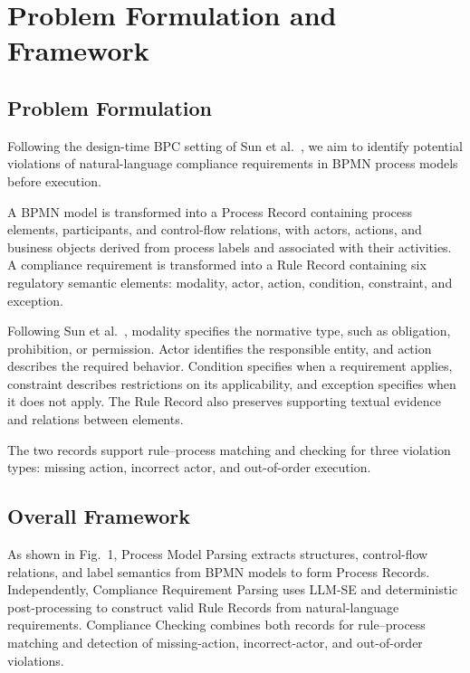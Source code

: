 \documentclass[conference]{IEEEtran}
\begin{document}
\section{Problem Formulation and Framework}
\label{sec:2}

\subsection{Problem Formulation}
\label{sec:2.1}

Following the design-time BPC setting of Sun et al.~\cite{sun2024design}, we aim to identify potential violations of natural-language compliance requirements in BPMN process models before execution.

A BPMN model is transformed into a Process Record containing process elements, participants, and control-flow relations, with actors, actions, and business objects derived from process labels and associated with their activities. A compliance requirement is transformed into a Rule Record containing six regulatory semantic elements: modality, actor, action, condition, constraint, and exception.

Following Sun et al.~\cite{sun2024design}, modality specifies the normative type, such as obligation, prohibition, or permission. Actor identifies the responsible entity, and action describes the required behavior. Condition specifies when a requirement applies, constraint describes restrictions on its applicability, and exception specifies when it does not apply. The Rule Record also preserves supporting textual evidence and relations between elements.

The two records support rule--process matching and checking for three violation types: missing action, incorrect actor, and out-of-order execution.

\subsection{Overall Framework}
\label{sec:2.2}

As shown in Fig.~1, Process Model Parsing extracts structures, control-flow relations, and label semantics from BPMN models to form Process Records. Independently, Compliance Requirement Parsing uses LLM-SE and deterministic post-processing to construct valid Rule Records from natural-language requirements. Compliance Checking combines both records for rule--process matching and detection of missing-action, incorrect-actor, and out-of-order violations.
\end{document}
